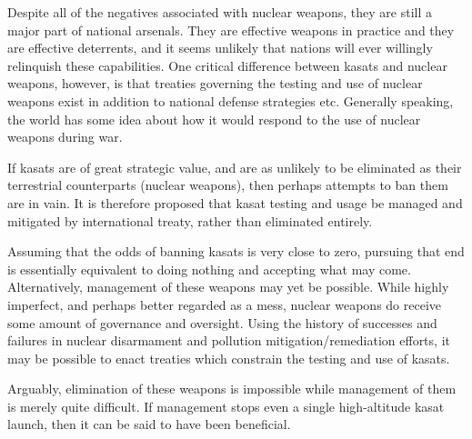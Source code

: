Despite all of the negatives associated with nuclear weapons, they are
still a major part of national arsenals.  They are effective weapons
in practice and they are effective deterrents\cite{getting-mad}, and
it seems unlikely that nations will ever willingly relinquish these
capabilities.  One critical difference between \acp{kasat} and nuclear
weapons, however, is that treaties governing the testing and use of
nuclear weapons exist in addition to national defense strategies etc.
Generally speaking, the world has some idea about how it would respond
to the use of nuclear weapons during war.\cite{old-timey-armageddon}

If \acp{kasat} are of great strategic value, and are as unlikely to be
eliminated as their terrestrial counterparts (nuclear weapons), then
perhaps attempts to ban them are in vain.  It is therefore proposed
that \ac{kasat} testing and usage be managed and mitigated by
international treaty, rather than eliminated entirely.

Assuming that the odds of banning \acp{kasat} is very close to zero,
pursuing that end is essentially equivalent to doing nothing and
accepting what may come.  Alternatively, management of these weapons
may yet be possible.  While highly imperfect, and perhaps better
regarded as a mess, nuclear weapons do receive some amount of
governance and oversight.  Using the history of successes and failures
in nuclear disarmament and pollution mitigation/remediation efforts,
it may be possible to enact treaties which constrain the testing and
use of \acp{kasat}.

Arguably, elimination of these weapons is impossible while management
of them is merely quite difficult.  If management stops even a single
high-altitude \ac{kasat} launch, then it can be said to have been
beneficial.
